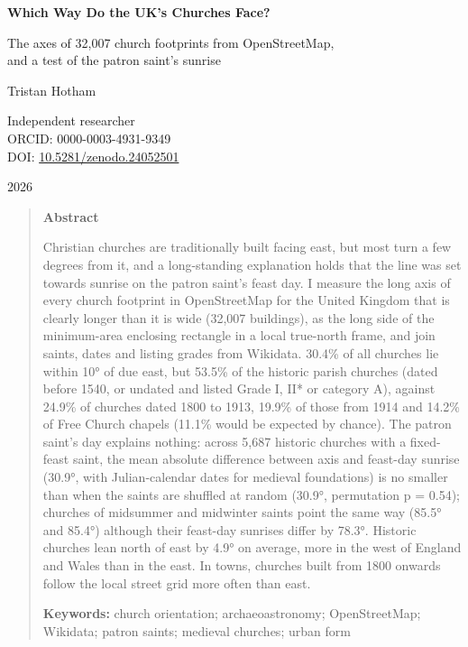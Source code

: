 \documentclass[11pt,a4paper]{article}
\begin{document}
\begin{center}
{\Large\bfseries Which Way Do the UK's Churches Face?\par}
\vspace{0.4em}
{\large The axes of 32,007 church footprints from OpenStreetMap,\\and a test of the patron saint's sunrise\par}
\vspace{1.2em}
{\large Tristan Hotham\par}
\vspace{0.3em}
{\small Independent researcher\\
ORCID: 0000-0003-4931-9349\\
DOI: \href{https://doi.org/10.5281/zenodo.24052501}{10.5281/zenodo.24052501}\par}
\vspace{0.8em}
2026
\end{center}

\begin{quote}
\small
\begin{center}\textbf{Abstract}\end{center}
Christian churches are traditionally built facing east, but most turn a few degrees from it, and a long-standing explanation holds that the line was set towards sunrise on the patron saint's feast day. I measure the long axis of every church footprint in OpenStreetMap for the United Kingdom that is clearly longer than it is wide (32,007 buildings), as the long side of the minimum-area enclosing rectangle in a local true-north frame, and join saints, dates and listing grades from Wikidata. 30.4\% of all churches lie within 10° of due east, but 53.5\% of the historic parish churches (dated before 1540, or undated and listed Grade I, II* or category A), against 24.9\% of churches dated 1800 to 1913, 19.9\% of those from 1914 and 14.2\% of Free Church chapels (11.1\% would be expected by chance). The patron saint's day explains nothing: across 5,687 historic churches with a fixed-feast saint, the mean absolute difference between axis and feast-day sunrise (30.9°, with Julian-calendar dates for medieval foundations) is no smaller than when the saints are shuffled at random (30.9°, permutation p = 0.54); churches of midsummer and midwinter saints point the same way (85.5° and 85.4°) although their feast-day sunrises differ by 78.3°. Historic churches lean north of east by 4.9° on average, more in the west of England and Wales than in the east. In towns, churches built from 1800 onwards follow the local street grid more often than east.

\textbf{Keywords:} church orientation; archaeoastronomy; OpenStreetMap; Wikidata; patron saints; medieval churches; urban form
\end{quote}
\end{document}
